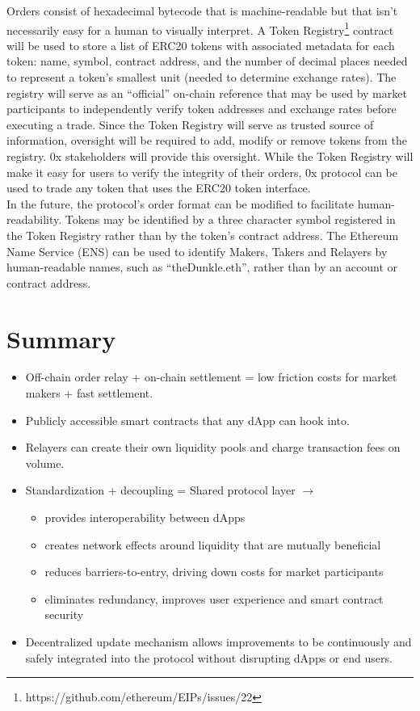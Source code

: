 \documentclass[10pt]{article}
\begin{document}
Orders consist of hexadecimal bytecode that is machine-readable but that isn't necessarily easy for a human to visually interpret. A Token Registry\footnote{https://github.com/ethereum/EIPs/issues/22} contract will be used to store a list of ERC20 tokens with associated metadata for each token: name, symbol, contract address, and the number of decimal places needed to represent a token's smallest unit (needed to determine exchange rates). The registry will serve as an “official” on-chain reference that may be used by market participants to independently verify token addresses and exchange rates before executing a trade. Since the Token Registry will serve as trusted source of information, oversight will be required to add, modify or remove tokens from the registry. 0x stakeholders will provide this oversight. While the Token Registry will make it easy for users to verify the integrity of their orders, 0x protocol can be used to trade any token that uses the ERC20 token interface. \\

\noindent In the future, the protocol's order format can be modified to facilitate human-readability. Tokens may be identified by a three character symbol registered in the Token Registry rather than by the token's contract address. The Ethereum Name Service (ENS) can  be used to identify Makers, Takers and Relayers by human-readable names, such as ``theDunkle.eth'', rather than by an account or contract address.

\clearpage

\pagebreak

\section{Summary}

\begin{itemize}[noitemsep]
\item Off-chain order relay + on-chain settlement = low friction costs for market makers + fast settlement.
\item Publicly accessible smart contracts that any dApp can hook into.
\item Relayers can create their own liquidity pools and charge transaction fees on volume.
\item Standardization + decoupling = Shared protocol layer $\rightarrow$
\begin{itemize}[noitemsep]
    \item provides interoperability between dApps
    \item creates network effects around liquidity that are mutually beneficial
    \item reduces barriers-to-entry, driving down costs for market participants
    \item eliminates redundancy, improves user experience and smart contract security
 \end{itemize}
\item Decentralized update mechanism allows improvements to be continuously and safely integrated into the protocol without disrupting dApps or end users.
\end{itemize}
\end{document}
